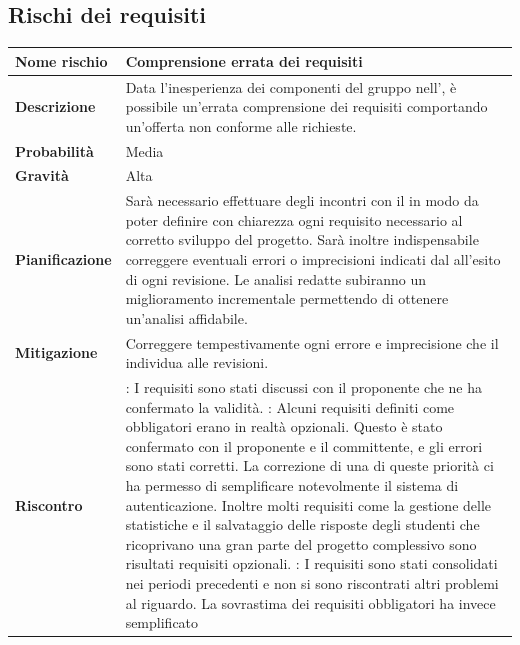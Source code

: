 \documentclass[12pt,a4paper]{article}
\begin{document}
\subsection{Rischi dei requisiti}

\begin{center}
	\begin{longtable}[H]{p{} p{}}
		\toprule
		\textbf{Nome rischio} & \textbf{Comprensione errata dei requisiti} \\*
		\midrule
		\midrule
		\textbf{Descrizione} & Data l’inesperienza dei componenti del gruppo nell’\AdR{}, è possibile un’errata comprensione dei requisiti comportando un’offerta non conforme alle richieste. \\*
		\midrule
		\textbf{Probabilità} & Media \\*
		\midrule
		\textbf{Gravità} & Alta \\*
		\midrule
		\textbf{Pianificazione} &  Sarà necessario effettuare degli incontri con il \mgls{proponente} in modo da poter definire con chiarezza ogni requisito necessario al corretto sviluppo del progetto. Sarà inoltre indispensabile correggere eventuali errori o imprecisioni indicati dal \mgls{committente} all’esito di ogni revisione. Le analisi redatte subiranno un miglioramento incrementale permettendo di ottenere un’analisi affidabile. \\*
		\midrule
		\textbf{Mitigazione} & Correggere tempestivamente ogni errore e imprecisione che il \mgls{committente} individua alle revisioni. \\*
        \midrule
        \textbf{Riscontro} & 
            \textbf{\FA{}}: I requisiti sono stati discussi con il proponente che ne ha confermato la 
                validità. \newline
            \textbf{\FAD{}}: Alcuni requisiti definiti come obbligatori erano in realtà opzionali.
                Questo è stato confermato con il proponente e il committente, e gli errori sono stati corretti.
                La correzione di una di queste priorità ci ha permesso di semplificare notevolmente
                il sistema di autenticazione. Inoltre molti requisiti come la gestione delle statistiche
                e il salvataggio delle risposte degli studenti che ricoprivano una gran parte del progetto
                complessivo sono risultati requisiti opzionali. \newline
            \textbf{\FPA{}}: I requisiti sono stati consolidati nei periodi precedenti e non si sono riscontrati
                altri problemi al riguardo. La sovrastima dei requisiti obbligatori ha invece semplificato

\end{longtable}
\end{center}
\end{document}
